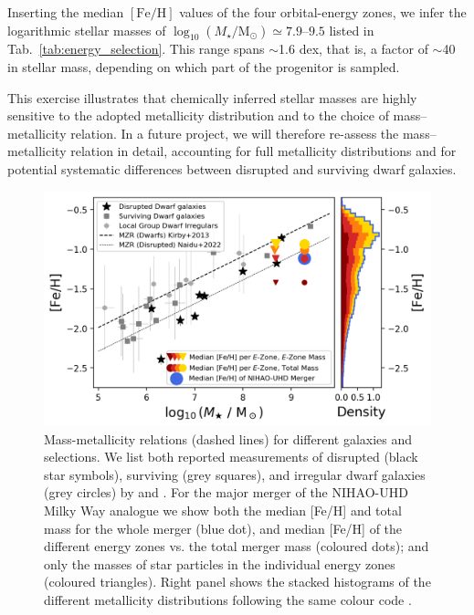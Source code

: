 \documentclass[fleqn,usenatbib]{mnras}
\begin{document}
Inserting the median $\mathrm{[Fe/H]}$ values of the four orbital-energy zones, we infer the logarithmic stellar masses of $\log_{10}(M_\star/\mathrm{M_\odot}) \simeq 7.9$–$9.5$ listed in Tab.~\ref{tab:energy_selection}. This range spans $\sim$1.6 dex, that is, a factor of $\sim$40 in stellar mass, depending on which part of the progenitor is sampled. 

This exercise illustrates that chemically inferred stellar masses are highly sensitive to the adopted metallicity distribution and to the choice of mass–metallicity relation. In a future project, we will therefore re-assess the mass–metallicity relation in detail, accounting for full metallicity distributions and for potential systematic differences between disrupted and surviving dwarf galaxies.

\begin{figure}
    \centering
    \includegraphics[width=\columnwidth]{figures/mzr_different_selections.png}
    \caption{Mass-metallicity relations (dashed lines) for different galaxies and selections. We list both reported measurements of disrupted (black star symbols), surviving  (grey squares), and irregular dwarf galaxies (grey circles) by \citet{Kirby2013} and \citet{Naidu2022b}. For the major merger of the NIHAO-UHD Milky Way analogue we show both the median [Fe/H] and total mass for the whole merger (blue dot), and median [Fe/H] of the different energy zones vs. the total merger mass (coloured dots); and only the masses of star particles in the individual energy zones (coloured triangles). Right panel shows the stacked histograms of the different metallicity distributions following the same colour code \href{https://github.com/svenbuder/golden_thread_I/tree/main/figures}{\faGithub}.}
    \label{fig:mzr_different_selections}
\end{figure}
\end{document}
